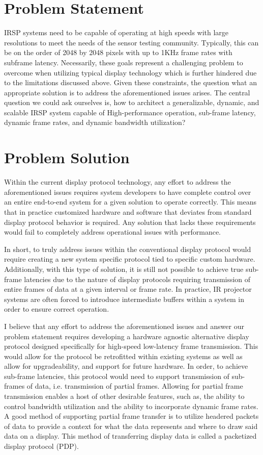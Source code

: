 \section{Problem Statement}
    IRSP systems need to be capable of operating at high speeds with large resolutions to meet the needs of the sensor testing community. Typically, this can be on the order of 2048 by 2048 pixels with up to 1KHz frame rates with subframe latency. Necessarily, these goals represent a challenging problem to overcome when utilizing typical display technology which is further hindered due to the limitations discussed above. Given these constraints, the question what an appropriate solution is to address the aforementioned issues arises. The central question we could ask ourselves is, how to architect a generalizable, dynamic, and scalable IRSP system capable of High-performance operation, sub-frame latency, dynamic frame rates, and dynamic bandwidth utilization?

\section{Problem Solution}
    Within the current display protocol technology, any effort to address the aforementioned issues requires system developers to have complete control over an entire end-to-end system for a given solution to operate correctly. This means that in practice customized hardware and software that deviates from standard display protocol behavior is required. Any solution that lacks these requirements would fail to completely address operational issues with performance.

    In short, to truly address issues within the conventional display protocol would require creating a new system specific protocol tied to specific custom hardware. Additionally, with this type of solution, it is still not possible to achieve true sub-frame latencies due to the nature of display protocols requiring transmission of entire frames of data at a given interval or frame rate. In practice, IR projector systems are often forced to introduce intermediate buffers within a system in order to ensure correct operation.

    I believe that any effort to address the aforementioned issues and answer our problem statement requires developing a hardware agnostic alternative display protocol designed specifically for high-speed low-latency frame transmission. This would allow for the protocol be retrofitted within existing systems as well as allow for upgradeability, and support for future hardware. In order, to achieve sub-frame latencies, this protocol would need to support transmission of sub-frames of data, i.e. transmission of partial frames. Allowing for partial frame transmission enables a host of other desirable features, such as, the ability to control bandwidth utilization and the ability to incorporate dynamic frame rates. A good method of supporting partial frame transfer is to utilize headered packets of data to provide a context for what the data represents and where to draw said data on a display. This method of transferring display data is called a packetized display protocol (PDP).

